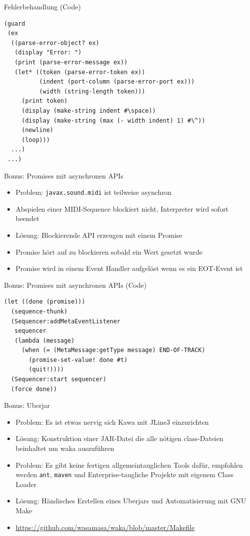 \documentclass[presentation]{beamer}
\begin{document}
\begin{frame}[fragile,label=sec-4-16]{Fehlerbehandlung (Code)}
 \begin{verbatim}
(guard
 (ex
  ((parse-error-object? ex)
   (display "Error: ")
   (print (parse-error-message ex))
   (let* ((token (parse-error-token ex))
          (indent (port-column (parse-error-port ex)))
          (width (string-length token)))
     (print token)
     (display (make-string indent #\space))
     (display (make-string (max (- width indent) 1) #\^))
     (newline)
     (loop)))
  ...)
 ...)
\end{verbatim}
\end{frame}

\begin{frame}[fragile,label=sec-4-17]{Bonus: Promises mit asynchronen APIs}
 \begin{itemize}
\item Problem: \texttt{javax.sound.midi} ist teilweise asynchron
\item Abspielen einer MIDI-Sequence blockiert nicht, Interpreter wird
sofort beendet
\item Lösung: Blockierende API erzeugen mit einem Promise
\item Promise hört auf zu blockieren sobald ein Wert gesetzt wurde
\item Promise wird in einem Event Handler aufgelöst wenn es ein EOT-Event
ist
\end{itemize}
\end{frame}

\begin{frame}[fragile,label=sec-4-18]{Bonus: Promises mit asynchronen APIs (Code)}
 \begin{verbatim}
(let ((done (promise)))
  (sequence-thunk)
  (Sequencer:addMetaEventListener
   sequencer
   (lambda (message)
     (when (= (MetaMessage:getType message) END-OF-TRACK)
       (promise-set-value! done #t)
       (quit!))))
  (Sequencer:start sequencer)
  (force done))
\end{verbatim}
\end{frame}

\begin{frame}[fragile,label=sec-4-19]{Bonus: Uberjar}
 \begin{itemize}
\item Problem: Es ist etwas nervig sich Kawa mit JLine3 einzurichten
\item Lösung: Konstruktion einer JAR-Datei die alle nötigen class-Dateien
beinhaltet um waka auszuführen
\item Problem: Es gibt keine fertigen allgemeintauglichen Tools dafür,
empfohlen werden \texttt{ant}, \texttt{maven} und Enterprise-taugliche Projekte
mit eigenem Class Loader
\item Lösung: Händisches Erstellen eines Uberjars und Automatisierung mit
GNU Make
\item \url{https://github.com/wasamasa/waka/blob/master/Makefile}
\end{itemize}
\end{frame}
\end{document}
